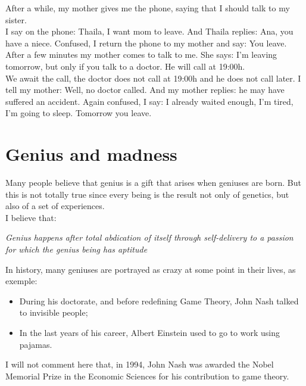 \documentclass[11pt]{book}
\begin{document}
\noindent After a while, my mother gives me the phone, saying that I should talk to my sister. \\

\noindent I say on the phone: Thaila, I want mom to leave. And Thaila replies: Ana, you have a niece. Confused, I return the phone to my mother and say: You leave. \\

\noindent After a few minutes my mother comes to talk to me. She says: I'm leaving tomorrow, but only if you talk to a doctor. He will call at 19:00h. \\

\noindent We await the call, the doctor does not call at 19:00h and he does not call later. I tell my mother: Well, no doctor called. And my mother replies: he may have suffered an accident. Again confused, I say: I already waited enough, I'm tired, I'm going to sleep. Tomorrow you leave. \\

\chapter{Genius and madness}

\noindent Many people believe that genius is a gift that arises when geniuses are born. But this is not totally true since every being is the result not only of genetics, but also of a set of experiences. \\

\noindent I believe that:

\noindent \begin{center} \emph{Genius happens after total abdication of itself through self-delivery to a passion for which the genius being has aptitude} \end{center} 

\noindent In history, many geniuses are portrayed as crazy at some point in their lives, as exemple:

\begin{itemize}
\item During his doctorate, and before redefining Game Theory, John Nash talked to invisible people; 
\item In the last years of his career, Albert Einstein used to go to work using pajamas. 
\end{itemize}

\noindent I will not comment here that, in 1994, John Nash was awarded the Nobel Memorial Prize in the Economic Sciences for his contribution to game theory. \\
\end{document}
